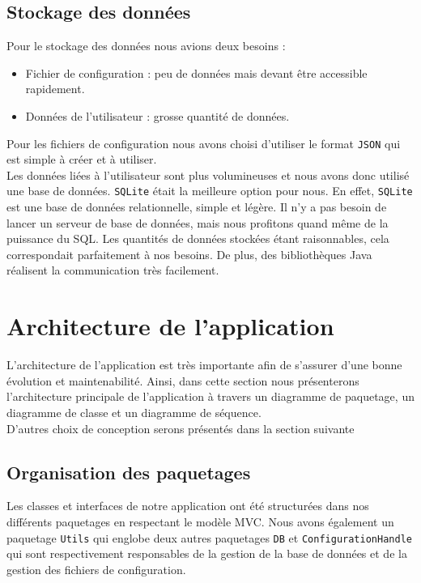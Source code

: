 \documentclass[10pt,a4paper]{article}
\begin{document}
\subsection{Stockage des données}

Pour le stockage des données nous avions deux besoins :
\begin{itemize}
    \item Fichier de configuration : peu de données mais devant être accessible rapidement.
    \item Données de l'utilisateur : grosse quantité de données. \\ 
\end{itemize}

Pour les fichiers de configuration nous avons choisi d'utiliser le format \verb|JSON| qui est simple à créer et à utiliser. \\

Les données liées à l'utilisateur sont plus volumineuses et nous avons donc utilisé une base de données.
\verb|SQLite|  était la meilleure option pour nous. En effet, \verb|SQLite| est une base de données relationnelle, simple et légère. Il n'y a pas besoin de lancer un serveur de base de données, mais nous profitons quand même de la puissance du SQL. Les quantités de données stockées étant raisonnables, cela correspondait parfaitement à nos besoins. De plus, des bibliothèques Java réalisent la communication très facilement.



\newpage

\section{Architecture de l'application}

L'architecture de l'application est très importante afin de s'assurer d'une bonne évolution et maintenabilité. Ainsi, dans cette section nous présenterons l'architecture principale de l'application à travers un diagramme de paquetage, un diagramme de classe et un diagramme de séquence. \\
D'autres choix de conception serons présentés dans la section suivante  \textit{}

\subsection{Organisation des paquetages}
Les classes et interfaces de notre application ont été structurées dans nos différents paquetages en respectant le modèle MVC. Nous avons également un paquetage \verb|Utils| qui englobe deux autres paquetages \verb|DB| et  \verb|ConfigurationHandle| qui sont respectivement responsables de la gestion de la base de données et de la gestion des fichiers de configuration.
\end{document}
